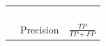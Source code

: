 \begin{table}[H]
\begin{tabular}{lll}
		\multicolumn{1}{|l|}{}                                                                                                                                                                                                                            & \multicolumn{1}{l|}{}                                                                                          & \multicolumn{1}{l|}{}                                                                                                             \\
		\multicolumn{1}{|l|}{}                                                                                                                                                                                                                            & \multicolumn{1}{l|}{}                                                                                          & \multicolumn{1}{l|}{}                                                                                                             \\
		\multicolumn{1}{|l|}{}                                                                                                                                                                                                                            & \multicolumn{1}{l|}{}                                                                                          & \multicolumn{1}{l|}{}                                                                                                             \\
		\multicolumn{1}{|l|}{}                                                                                                                                                                                                                            & \multicolumn{1}{l|}{}                                                                                          & \multicolumn{1}{l|}{}                                                                                                             \\ \cline{2-3} 
		\multicolumn{1}{|l|}{}                                                                                                                                                                                                                            & \multicolumn{1}{l|}{\multirow{2}{*}{Precision}}                                                                & \multicolumn{1}{l|}{\multirow{2}{*}{\(\frac{TP}{TP + FP}\)}}                                                                      \\

\end{tabular}
\end{table}
